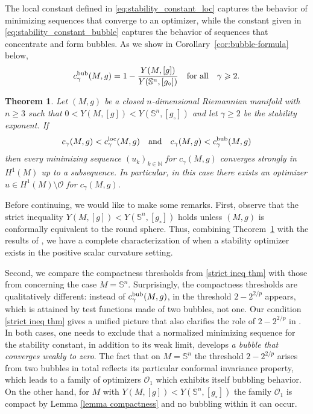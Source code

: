 \documentclass[reqno,11pt]{amsart}
\numberwithin{equation}{section}
\newtheorem{theorem}{Theorem}[section]
\theoremstyle{definition}
\theoremstyle{remark}
\newcommand{\Ss}{\mathbb{S}}
\begin{document}
The local constant defined in \eqref{eq:stability_constant_loc} captures the 
behavior of minimizing sequences that converge to an optimizer, 
while the constant given in \eqref{eq:stability_constant_bubble} captures the 
behavior of sequences that concentrate and form bubbles. As we show in 
Corollary~\ref{cor:bubble-formula} below,
\[
c_{\gamma}^{\rm bub}(M,g) = 1 - \frac{Y(M,[g])}{Y(\Ss^n,[g_\circ])} \quad {\rm for \ all} \quad \gamma \geqslant 2.
\]

\begin{theorem}
\label{theorem existence stab opt gen M}
Let $(M,g)$ be a closed $n$-dimensional Riemannian manifold with $n \geqslant 3$ such 
that $0 < Y(M,[g]) < Y(\Ss^n,[g_\circ])$ and let $\gamma \geqslant 2$ be the stability
exponent. If 
\begin{equation}
\label{strict ineq thm}
c_{\gamma}(M,g) < c_{\gamma}^{\mathrm{loc}}(M,g) \quad {\rm and} 
\quad c_{\gamma}(M,g) < c_{\gamma}^{\rm bub}(M,g)
\end{equation}
then every minimizing sequence $(u_k)_{k \in \mathbb{N}}$ for $c_{\gamma}(M,g)$ 
converges strongly in $H^1(M)$ up to a subsequence. In particular, in this case 
there exists an optimizer $u \in H^1(M) \setminus \mathscr{O}$ for $c_{\gamma}(M,g)$.
\end{theorem}

Before continuing, we would like to make some remarks. First, observe that the strict 
inequality $Y(M, [g]) < Y(\Ss^n, [g_\circ])$ holds
unless $(M, g)$ is conformally equivalent to the round sphere. Thus, combining 
Theorem~\ref{theorem existence stab opt gen M} with the results of \cite{arXiv:2211.14185}, we 
have a complete characterization of when a stability optimizer exists in the 
positive scalar curvature setting. 

Second, we compare the compactness thresholds from \eqref{strict ineq thm}
with those from \cite{arXiv:2211.14185} concerning the case $M = \Ss^n$. Surprisingly, the 
compactness thresholds are qualitatively different: instead
of $c_{\gamma}^{\rm bub}(M,g)$, in \cite{arXiv:2211.14185} the threshold $2 - 2^{2/p}$ appears, 
which is attained by test functions made of two bubbles, not one. Our condition \eqref{strict ineq thm} gives 
a unified picture that also clarifies the role of $2 - 2^{2/p}$ in \cite{arXiv:2211.14185}.
In both cases, 
one needs to exclude that a normalized minimizing sequence for the stability constant, in addition to its 
weak limit, develops \emph{a bubble that converges weakly to zero}. The fact that on $M = \mathbb S^n$ the 
threshold $2 - 2^{2/p}$ arises from two bubbles in total reflects its particular conformal invariance 
property, which leads to a family of  optimizers $\mathscr{O}_1$ which exhibits itself bubbling behavior. 
On the other hand, for $M$ with $Y(M,[g]) < Y(\Ss^n,[g_\circ])$ the family $\mathscr{O}_1$ is compact by 
Lemma \ref{lemma compactness} and no bubbling within it can occur. 
\end{document}
